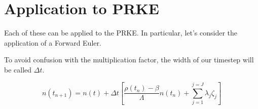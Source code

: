 \documentclass[12pt]{article}
\begin{document}
\section*{Application to PRKE}

Each of these can be applied to the PRKE. In particular, let's consider the 
application of a Forward Euler.

To avoid confusion with the multiplication factor, the width of our timestep will be called $\Delta t$.

\begin{equation}
n(t_{n+1}) = n(t) + \Delta t\left[\frac{\rho(t_n)-\beta}{\Lambda}n(t_n) + \displaystyle\sum^{j=J}_{j=1}\lambda_j\zeta_j\right]
\end{equation}
\end{document}

